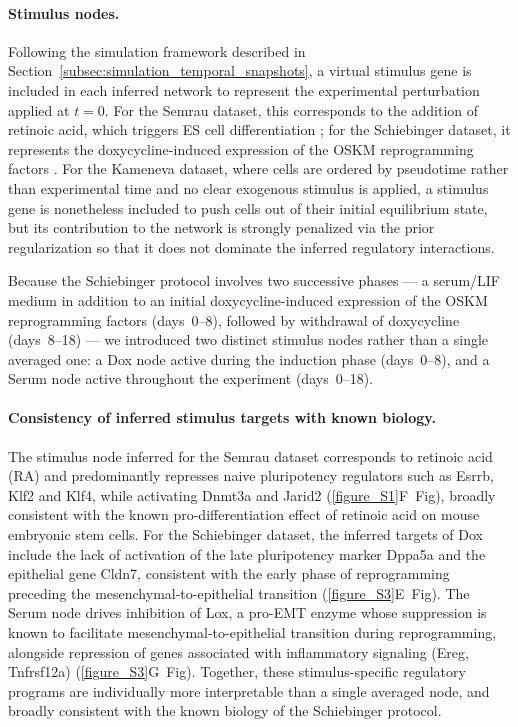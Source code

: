\documentclass[a4paper, 11pt]{article}
\theoremstyle{plain}
\theoremstyle{remark}
\begin{document}
\begin{appendices}
\paragraph{Stimulus nodes.} Following the simulation framework described in 
Section~\ref{subsec:simulation_temporal_snapshots}, a virtual stimulus gene is included in each 
inferred network to represent the experimental perturbation applied at $t=0$. 
For the Semrau dataset, this corresponds to the addition of retinoic acid, which 
triggers ES cell differentiation \cite{Semrau_2017}; for the Schiebinger dataset, 
it represents the doxycycline-induced expression of the OSKM reprogramming 
factors \cite{schiebinger2019optimal}. For the Kameneva dataset, where cells are 
ordered by pseudotime rather than experimental time and no clear exogenous 
stimulus is applied, a stimulus gene is nonetheless included to push cells out of 
their initial equilibrium state, but its contribution to the network is strongly 
penalized via the prior regularization so that it does not dominate the inferred 
regulatory interactions.

Because the Schiebinger protocol involves two successive phases --- a serum/LIF medium in addition to an initial 
doxycycline-induced expression of the OSKM reprogramming factors (days~0--8), 
followed by withdrawal of doxycycline (days~8--18) \cite{schiebinger2019optimal} --- we introduced two 
distinct stimulus nodes rather than a single averaged one: a Dox node active 
during the induction phase (days~0--8), and a Serum node active throughout the 
experiment (days~0--18).

\paragraph{Consistency of inferred stimulus targets with known biology.} 
The stimulus node inferred for the Semrau dataset corresponds to retinoic acid 
(RA) and predominantly represses naive pluripotency regulators such as Esrrb, 
Klf2 and Klf4, while activating Dnmt3a and Jarid2 (\ref{figure_S1}F~Fig), 
broadly consistent with the known pro-differentiation effect of retinoic acid on 
mouse embryonic stem cells. For the Schiebinger dataset, the inferred targets of 
Dox include the lack of activation of the late pluripotency marker Dppa5a and the 
epithelial gene Cldn7, consistent with the early phase of reprogramming preceding 
the mesenchymal-to-epithelial transition (\ref{figure_S3}E~Fig). The Serum 
node drives inhibition of Lox, a pro-EMT enzyme whose suppression is known to 
facilitate mesenchymal-to-epithelial transition during reprogramming, alongside 
repression of genes associated with inflammatory signaling (Ereg, Tnfrsf12a) 
(\ref{figure_S3}G~Fig). Together, these stimulus-specific regulatory programs 
are individually more interpretable than a single averaged node, and broadly 
consistent with the known biology of the Schiebinger protocol.


\end{appendices}
\end{document}
